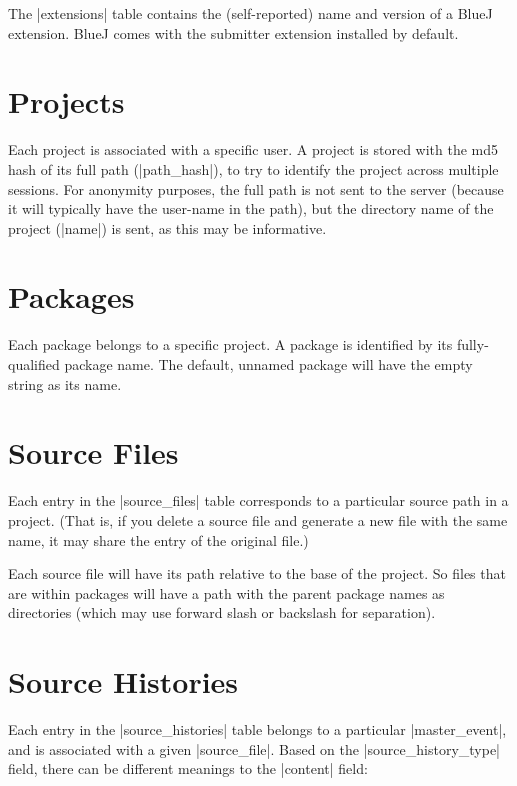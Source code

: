 \documentclass{report}
\begin{document}

The |extensions| table contains the (self-reported) name and version of a
BlueJ extension.  BlueJ comes with the submitter extension installed by default.

\section{Projects}


Each project is associated with a specific user.  A project is stored with the
md5 hash of its full path (|path_hash|), to try to identify the project across multiple
sessions.  For anonymity purposes, the full path is not sent to the server
(because it will typically have the user-name in the path), but the directory
name of the project (|name|) is sent, as this may be informative.

\section{Packages}


Each package belongs to a specific project.  A package is identified by its
fully-qualified package name.  The default, unnamed package will have the
empty string as its name.

\section{Source Files}


Each entry in the |source_files| table corresponds to a particular
source path in a project.  (That is, if you delete a source file and
generate a new file with the same name, it may share the entry of the
original file.)

Each source file will have its path relative to the base of the
project.  So files that are within packages will have a path with the
parent package names as directories (which may use forward slash or
backslash for separation).

\section{Source Histories}


Each entry in the |source_histories| table belongs to a particular
|master_event|, and is associated with a given |source_file|.  Based on the
|source_history_type| field, there can be different meanings to the |content| field:
\end{document}
